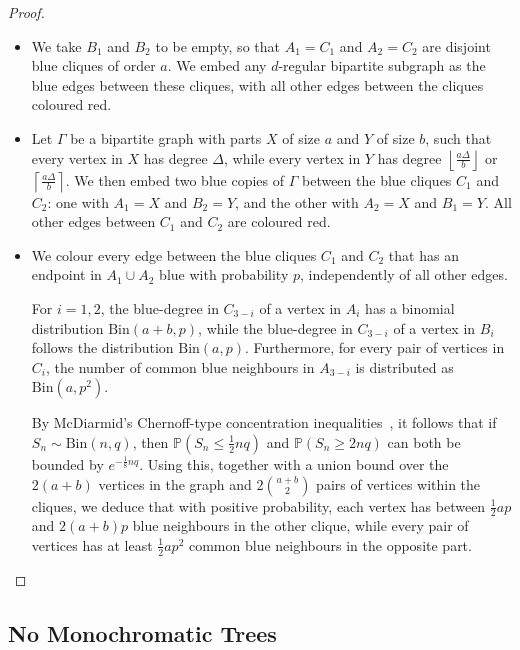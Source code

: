 \documentclass[11pt]{article}
\begin{document}
\begin{proof}
    \begin{itemize}
        \item[(a)] We take $B_1$ and $B_2$ to be empty, so that $A_1 = C_1$ and $A_2 = C_2$ are disjoint blue cliques of order $a$. We embed any $d$-regular bipartite subgraph as the blue edges between these cliques, with all other edges between the cliques coloured red.
        \item[(b)] Let $\Gamma$ be a bipartite graph with parts $X$ of size $a$ and $Y$ of size $b$, such that every vertex in $X$ has degree $\Delta$, while every vertex in $Y$ has degree $\left \lfloor \frac{a\Delta}{b} \right\rfloor$ or $\left \lceil \frac{a \Delta}{b} \right \rceil$. We then embed two blue copies of $\Gamma$ between the blue cliques $C_1$ and $C_2$: one with $A_1 = X$ and $B_2 = Y$, and the other with $A_2 = X$ and $B_1 = Y$. All other edges between $C_1$ and $C_2$ are coloured red.
        \item[(c)] We colour every edge between the blue cliques $C_1$ and $C_2$ that has an endpoint in $A_1 \cup A_2$ blue with probability $p$, independently of all other edges.

        For $i = 1, 2$, the blue-degree in $C_{3-i}$ of a vertex in $A_i$ has a binomial distribution $\mathrm{Bin}(a+b,p)$, while the blue-degree in $C_{3-i}$ of a vertex in $B_i$ follows the distribution $\mathrm{Bin}(a,p)$. Furthermore, for every pair of vertices in $C_i$, the number of common blue neighbours in $A_{3-i}$ is distributed as $\mathrm{Bin}(a,p^2)$.

        By McDiarmid's Chernoff-type concentration inequalities~\cite[Theorem 2.3]{mcdiarmid1998concentration}, it follows that if $S_n \sim \mathrm{Bin}(n,q)$, then $\mathbb{P}(S_n \le \frac12 nq)$ and $\mathbb{P}(S_n \ge 2nq)$ can both be bounded by $e^{-\frac18 nq}$. Using this, together with a union bound over the $2(a+b)$ vertices in the graph and $2 \binom{a+b}{2}$ pairs of vertices within the cliques, we deduce that with positive probability, each vertex has between $\frac12 ap$ and $2(a+b)p$ blue neighbours in the other clique, while every pair of vertices has at least $\frac12 ap^2$ common blue neighbours in the opposite part. \qedhere
    \end{itemize}
\end{proof}


\subsection{No Monochromatic Trees}
\end{document}
